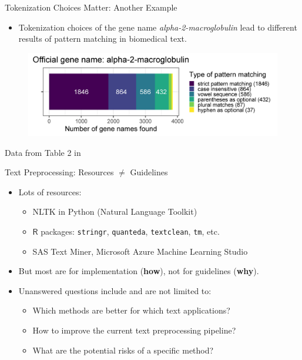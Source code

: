\documentclass{beamer}
\renewcommand{\cite}{\citep}
\begin{document}

\begin{frame}{Tokenization Choices Matter: Another Example}
\begin{itemize}
\item Tokenization choices of the gene name \textit{alpha-2-macroglobulin} lead to different results of pattern matching in biomedical text.
\end{itemize}
\begin{figure}[!ht]
	\centering
	\includegraphics[width=\textwidth]{Figures/cohen2002_table2_legend.png}
\end{figure}
\begin{flushright}
Data from Table 2 in~\cite{cohen2002contrast}
\end{flushright}
\end{frame}

\begin{frame}{Text Preprocessing: Resources $\neq$ Guidelines}
\begin{itemize}
\item Lots of resources:
	\begin{itemize}
	\item NLTK in Python (Natural Language Toolkit)~\cite{bird2009natural}
	\item $\mathsf{R}$ packages: \texttt{stringr}, \texttt{quanteda}, \texttt{textclean}, \texttt{tm}, etc.
	\item SAS Text Miner, Microsoft Azure Machine Learning Studio
	\end{itemize}
\item But most are for implementation (\textbf{how}), not for guidelines (\textbf{why}).
	\bigskip
\item Unanswered questions include and are not limited to:
	\begin{itemize}
	\item Which methods are better for which text applications? %
	\item How to improve the current text preprocessing pipeline?
	\item What are the potential risks of a specific method?
	\end{itemize}
\end{itemize}
\end{frame}
\end{document}
